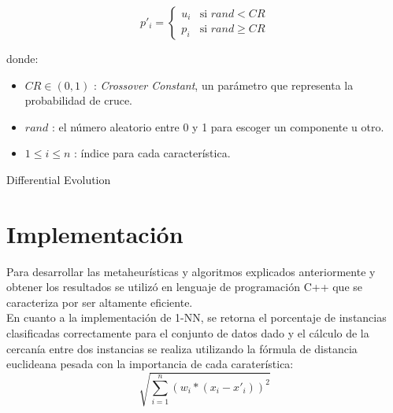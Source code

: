 \documentclass{ci5652}
\begin{document}
\[
p'_i =
  \begin{cases}
    u_i & \text{si } rand < CR\\
    p_i & \text{si } rand \geq CR
  \end{cases}
\]

donde:
\begin{itemize}
  \item $CR \in (0,1)$ : \textit{Crossover Constant}, un parámetro que
  representa la probabilidad de cruce.
  \item $rand$ : el número aleatorio entre 0 y 1 para escoger un componente u
  otro.
  \item $1 \leq i \leq n $ : índice para cada característica.
\end{itemize}

\begin{algorithm}
 \DontPrintSemicolon
 \vspace*{0.1cm}
 \vspace*{0.1cm}
 \caption{Differential Evolution}
\end{algorithm}


\section{Implementación}

Para desarrollar las metaheurísticas y algoritmos explicados anteriormente y
obtener los resultados se utilizó en lenguaje de programación C++ que se
caracteriza por ser altamente eficiente.\\

En cuanto a la implementación de 1-NN, se retorna el porcentaje de instancias
clasificadas correctamente para el conjunto de datos dado y el cálculo de la
cercanía entre dos instancias se realiza utilizando la fórmula de distancia
euclideana pesada con la importancia de cada caraterística:
$$\sqrt{\sum_{i=1}^n (w_i * (x_i - x'_i))^{2}}$$
\end{document}
